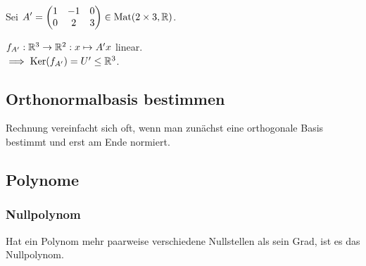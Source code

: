 Sei $\displaystyle A'=\begin{pmatrix} 1 & -1 & 0 \\ 0 & 2 & 3 \end{pmatrix} \in\operatorname{Mat}(2\times3, \mathbb{R})$.

$f_{A'}: \mathbb{R}^3 \to \mathbb{R}^2: x\mapsto A'x$ linear. \\
$\implies \operatorname{Ker}(f_{A'})=U' \le \mathbb{R}^3$.

\subsection*{Orthonormalbasis bestimmen}
Rechnung vereinfacht sich oft,
wenn man zunächst eine orthogonale Basis bestimmt
und erst am Ende normiert.

\subsection*{Polynome}
\subsubsection*{Nullpolynom}
Hat ein Polynom mehr paarweise verschiedene Nullstellen als sein Grad,
ist es das Nullpolynom.
